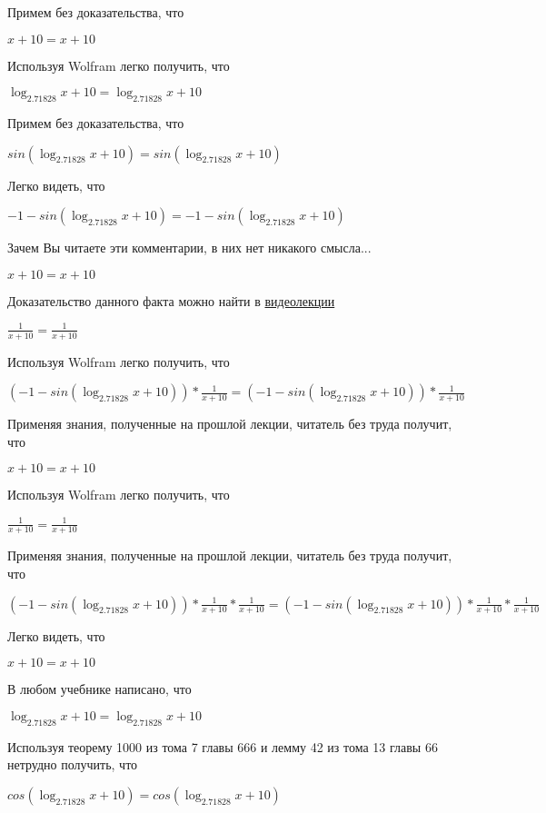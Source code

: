 \documentclass[12pt,a4paper,fleqn]{article}
\theoremstyle{definition}
\begin{document}
Примем без доказательства, что 

$ x  +  10  =  x  +  10 $

Используя Wolfram легко получить, что 

$\log_{ 2.71828 }{ x  +  10 } = \log_{ 2.71828 }{ x  +  10 }$

Примем без доказательства, что 

$sin(\log_{ 2.71828 }{ x  +  10 }) = sin(\log_{ 2.71828 }{ x  +  10 })$

Легко видеть, что 

$ -1  - sin(\log_{ 2.71828 }{ x  +  10 }) =  -1  - sin(\log_{ 2.71828 }{ x  +  10 })$

Зачем Вы читаете эти комментарии, в них нет никакого смысла... 

$ x  +  10  =  x  +  10 $

Доказательство данного факта можно найти в \href{https://www.youtube.com/watch?v=dQw4w9WgXcQ}{видеолекции} 

$\frac{ 1 }{ x  +  10 }
 = \frac{ 1 }{ x  +  10 }
$

Используя Wolfram легко получить, что 

$( -1  - sin(\log_{ 2.71828 }{ x  +  10 })) * \frac{ 1 }{ x  +  10 }
 = ( -1  - sin(\log_{ 2.71828 }{ x  +  10 })) * \frac{ 1 }{ x  +  10 }
$

Применяя знания, полученные на прошлой лекции, читатель без труда получит, что 

$ x  +  10  =  x  +  10 $

Используя Wolfram легко получить, что 

$\frac{ 1 }{ x  +  10 }
 = \frac{ 1 }{ x  +  10 }
$

Применяя знания, полученные на прошлой лекции, читатель без труда получит, что 

$( -1  - sin(\log_{ 2.71828 }{ x  +  10 })) * \frac{ 1 }{ x  +  10 }
 * \frac{ 1 }{ x  +  10 }
 = ( -1  - sin(\log_{ 2.71828 }{ x  +  10 })) * \frac{ 1 }{ x  +  10 }
 * \frac{ 1 }{ x  +  10 }
$

Легко видеть, что 

$ x  +  10  =  x  +  10 $

В любом учебнике написано, что 

$\log_{ 2.71828 }{ x  +  10 } = \log_{ 2.71828 }{ x  +  10 }$

Используя теорему 1000 из тома 7 главы 666 и лемму 42 из тома 13 главы 66 нетрудно получить, что 

$cos(\log_{ 2.71828 }{ x  +  10 }) = cos(\log_{ 2.71828 }{ x  +  10 })$
\end{document}
